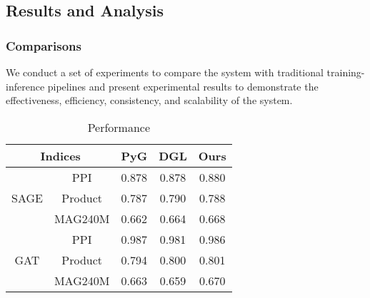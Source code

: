 \documentclass[conference]{IEEEtran}
\begin{document}



\subsection{Results and Analysis}
\label{sec_results_and_analysis}
\subsubsection{Comparisons}
We conduct a set of experiments to compare the system with traditional training-inference pipelines and present experimental results to demonstrate the effectiveness, efficiency, consistency, and scalability of the system.

\begin{table}%
	\centering
	\caption{Performance}
	\label{tab:performance}
	\begin{tabular}{ccccc}
		\toprule
		 \multicolumn{2}{c}{Indices} & PyG &DGL &Ours  \\ 
		\midrule
		\multirow{3}{*}{SAGE} & PPI & 0.878 &0.878 & 0.880  \\
		\cmidrule(lr){2-2}
						&Product &0.787 &0.790 &0.788   \\
		\cmidrule(lr){2-2}
						& MAG240M & 0.662 &0.664 &0.668  \\
		\cmidrule(lr){1-5}				   
		\multirow{3}{*}{GAT}  & PPI & 0.987 &0.981 & 0.986  \\
		\cmidrule(lr){2-2}
						   &Product &0.794 &0.800 &0.801  \\
		\cmidrule(lr){2-2}
						   & MAG240M & 0.663 &0.659 & 0.670  \\
		\bottomrule
	\end{tabular}
\end{table}
\end{document}
